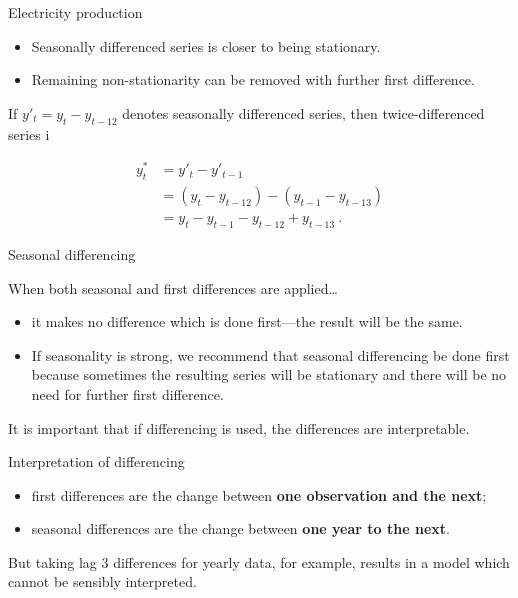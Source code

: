 \documentclass[14pt,ignorenonframetext,]{beamer}
\providecommand{\tightlist}{%
  \setlength{\itemsep}{0pt}\setlength{\parskip}{0pt}}
\begin{document}
\begin{frame}{Electricity production}

\begin{itemize}
\tightlist
\item
  Seasonally differenced series is closer to being stationary.
\item
  Remaining non-stationarity can be removed with further first
  difference.
\end{itemize}

If \(y'_t = y_t - y_{t-12}\) denotes seasonally differenced series, then
twice-differenced series i

\begin{block}{}
\begin{align*}
y^*_t &= y'_t - y'_{t-1} \\
      &= (y_t - y_{t-12}) - (y_{t-1} - y_{t-13}) \\
      &= y_t - y_{t-1} - y_{t-12} + y_{t-13}\: .
\end{align*}
\end{block}

\vspace*{10cm}

\end{frame}

\begin{frame}{Seasonal differencing}

When both seasonal and first differences are applied\dots\pause

\begin{itemize}
\tightlist
\item
  it makes no difference which is done first---the result will be the
  same.
\item
  If seasonality is strong, we recommend that seasonal differencing be
  done first because sometimes the resulting series will be stationary
  and there will be no need for further first difference. \pause
\end{itemize}

It is important that if differencing is used, the differences are
interpretable.

\end{frame}

\begin{frame}{Interpretation of differencing}

\begin{itemize}
\tightlist
\item
  first differences are the change between
  \textbf{one observation and the
  next};
\item
  seasonal differences are the change between \textbf{one year to the
  next}. \pause
\end{itemize}

But taking lag 3 differences for yearly data, for example, results in a
model which cannot be sensibly interpreted.

\end{frame}
\end{document}
